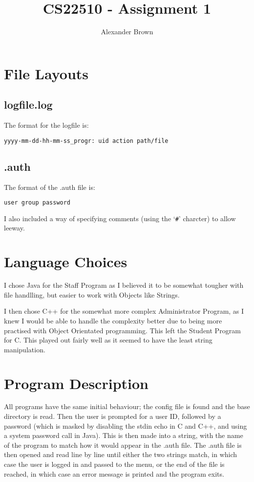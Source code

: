\documentclass[10pt,letterpaper]{article}
\title{CS22510 - Assignment 1}
\author{Alexander Brown}
\begin{document}
	\maketitle
	\newpage	
		\section{File Layouts}
			\subsection{logfile.log}
				The format for the logfile is:
				
				\verb+yyyy-mm-dd-hh-mm-ss_progr: uid action path/file+

				

			\subsection{.auth}
				The format of the .auth file is:

				\verb+user group password+
				
				I also included a way of specifying comments (using the `\verb+#+' charcter) to allow leeway.
			
		\section{Language Choices}
			I chose Java for the Staff Program as I believed it to be somewhat tougher with file handlling, but easier to work with Objects like Strings.
			
			I then chose C++ for the somewhat more complex Administrator Program, as I knew I would be able to handle the complexity better due to being more practised with Object Orientated programming. This left the Student Program for C. This played out fairly well as it seemed to have the least string manipulation.

		\section{Program Description}

			All programs have the same initial behaviour; the config file is found and the base directory is read. Then the user is prompted for a user ID, followed by a password (which is masked by disabling the stdin echo in C and C++, and using a system password call in Java). This is then made into a string, with the name of the program to match how it would appear in the .auth file. The .auth file is then opened and read line by line until either the two strings match, in which case the user is logged in and passed to the menu, or the end of the file is reached, in which case an error message is printed and the program exits.
\end{document}
